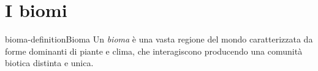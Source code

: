 \documentclass[preview]{standalone}
\begin{document}
\genpage

\section{I biomi}

\begin{snippetdefinition}{bioma-definition}{Bioma}
    Un \textit{bioma} è una vasta regione del mondo caratterizzata da forme dominanti
    di piante e clima, che interagiscono producendo una comunità biotica distinta e unica.
\end{snippetdefinition}



\end{document}
